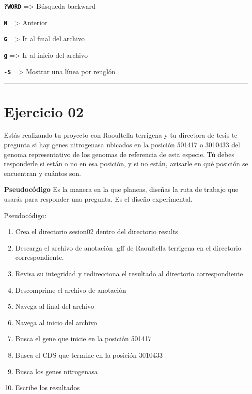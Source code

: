 \documentclass[
]{book}
\begin{document}
\textbf{\texttt{?WORD}} =\textgreater{} Búsqueda backward

\textbf{\texttt{N}} =\textgreater{} Anterior

\textbf{\texttt{G}} =\textgreater{} Ir al final del archivo

\textbf{\texttt{g}} =\textgreater{} Ir al inicio del archivo

\textbf{\texttt{-S}} =\textgreater{} Mostrar una línea por renglón

\begin{center}\rule{0.5\linewidth}{0.5pt}\end{center}

\section{Ejercicio 02}\label{ejercicio-02}

Estás realizando tu proyecto con Raoultella terrigena y tu directora de tesis te pregunta si hay genes nitrogenasa ubicados en la posición 501417 o 3010433 del genoma representativo de los genomas de referencia de esta especie. Tú debes responderle si están o no en esa posición, y si no están, avisarle en qué posición se encuentran y cuántos son.

\textbf{Pseudocódigo} Es la manera en la que planeas, diseñas la ruta de trabajo que usarás para responder una pregunta. Es el diseño experimental.

Pseudocódigo:

\begin{enumerate}
\def\labelenumi{\arabic{enumi}.}
\item
  Crea el directorio sesion02 dentro del directorio results
\item
  Descarga el archivo de anotación .gff de Raoultella terrigena en el directorio correspondiente.
\item
  Revisa su integridad y redirecciona el resultado al directorio correspondiente
\item
  Descomprime el archivo de anotación
\item
  Navega al final del archivo
\item
  Navega al inicio del archivo
\item
  Busca el gene que inicie en la posición 501417
\item
  Busca el CDS que termine en la posición 3010433
\item
  Busca los genes nitrogenasa
\item
  Escribe los resultados
\end{enumerate}
\end{document}
